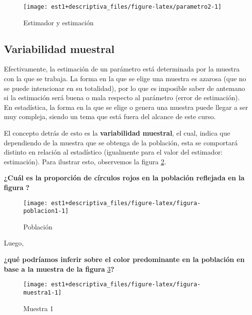 \documentclass[
]{book}
\theoremstyle{definition}
\theoremstyle{definition}
\theoremstyle{definition}
\theoremstyle{definition}
\theoremstyle{remark}
\begin{document}
\begin{figure}

{\centering \texttt{[image: est1+descriptiva\_files/figure-latex/parametro2-1]} 

}

\caption{Estimador y estimación}\label{fig:parametro2}
\end{figure}

\hypertarget{variabilidad-muestral}{%
\subsection{Variabilidad muestral}\label{variabilidad-muestral}}

Efectivamente, la estimación de un parámetro está determinada por la muestra con la que se trabaja. La forma en la que se elige una muestra es azarosa (que no se puede intencionar en su totalidad), por lo que es imposible saber de antemano si la estimación será buena o mala respecto al parámetro (error de estimación). En estadística, la forma en la que se elige o genera una muestra puede llegar a ser muy compleja, siendo un tema que está fuera del alcance de este curso.

El concepto detrás de esto es la \textbf{variabilidad muestral}, el cual, indica que dependiendo de la muestra que se obtenga de la población, esta se comportará distinto en relación al estadístico (igualmente para el valor del estimador: estimación). Para ilustrar esto, observemos la figura \ref{fig:figura-poblacion1}.

\textbf{¿Cuál es la proporción de círculos rojos en la población reflejada en la figura} \textbf{?}

\begin{figure}

{\centering \texttt{[image: est1+descriptiva\_files/figure-latex/figura-poblacion1-1]} 

}

\caption{Población}\label{fig:figura-poblacion1}
\end{figure}

Luego,

\textbf{¿qué podríamos inferir sobre el color predominante en la población en base a la muestra de la figura} \ref{fig:figura-muestra1}\textbf{?}

\begin{figure}

{\centering \texttt{[image: est1+descriptiva\_files/figure-latex/figura-muestra1-1]} 

}

\caption{Muestra 1}\label{fig:figura-muestra1}
\end{figure}
\end{document}
